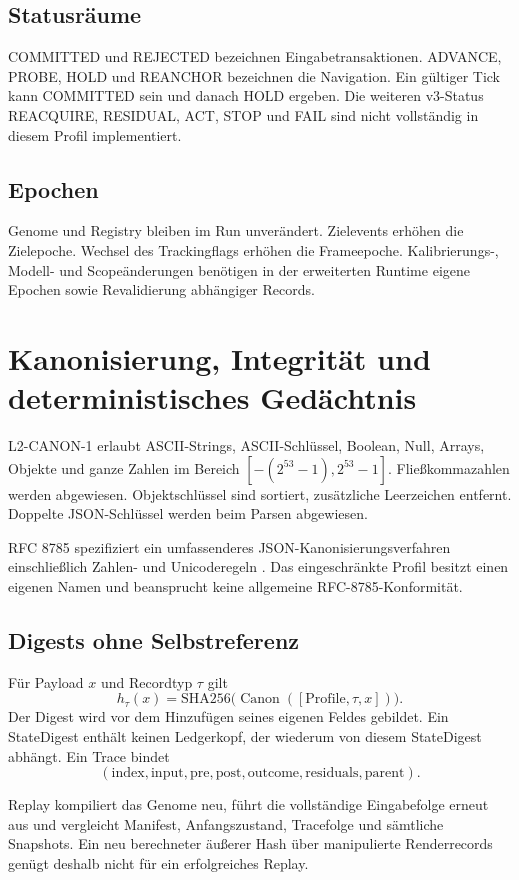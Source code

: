 \documentclass[11pt,a4paper]{article}
\newcommand{\nextsection}[2]{\clearpage{\color{accent}\small\textsf{#1}}\section{#2}}
\begin{document}
\subsection{Statusräume}
COMMITTED und REJECTED bezeichnen Eingabetransaktionen.
ADVANCE, PROBE, HOLD und REANCHOR bezeichnen die Navigation.
Ein gültiger Tick kann COMMITTED sein und danach HOLD ergeben.
Die weiteren v3-Status REACQUIRE, RESIDUAL, ACT, STOP und FAIL
sind nicht vollständig in diesem Profil implementiert.

\subsection{Epochen}
Genome und Registry bleiben im Run unverändert. Zielevents erhöhen
die Zielepoche. Wechsel des Trackingflags erhöhen die Frameepoche.
Kalibrierungs-, Modell- und Scopeänderungen benötigen in der
erweiterten Runtime eigene Epochen sowie Revalidierung abhängiger Records.

\nextsection{12 / REPLAY}{Kanonisierung, Integrität und deterministisches Gedächtnis}
L2-CANON-1 erlaubt ASCII-Strings, ASCII-Schlüssel, Boolean, Null,
Arrays, Objekte und ganze Zahlen im Bereich
$[-(2^{53}-1),2^{53}-1]$. Fließkommazahlen werden abgewiesen.
Objektschlüssel sind sortiert, zusätzliche Leerzeichen entfernt.
Doppelte JSON-Schlüssel werden beim Parsen abgewiesen.

RFC 8785 spezifiziert ein umfassenderes JSON-Kanonisierungsverfahren
einschließlich Zahlen- und Unicoderegeln \cite{jcs}. Das eingeschränkte
Profil besitzt einen eigenen Namen und beansprucht keine allgemeine
RFC-8785-Konformität.

\subsection{Digests ohne Selbstreferenz}
Für Payload $x$ und Recordtyp $\tau$ gilt
\[
h_\tau(x)=\mathrm{SHA256}
\big(\operatorname{Canon}([\mathrm{Profile},\tau,x])\big).
\]
Der Digest wird vor dem Hinzufügen seines eigenen Feldes gebildet.
Ein StateDigest enthält keinen Ledgerkopf, der wiederum von
diesem StateDigest abhängt. Ein Trace bindet
\[
(\mathrm{index},\mathrm{input},\mathrm{pre},\mathrm{post},
\mathrm{outcome},\mathrm{residuals},\mathrm{parent}).
\]

Replay kompiliert das Genome neu, führt die vollständige Eingabefolge
erneut aus und vergleicht Manifest, Anfangszustand, Tracefolge und
sämtliche Snapshots. Ein neu berechneter äußerer Hash über
manipulierte Renderrecords genügt deshalb nicht für ein erfolgreiches Replay.
\end{document}
